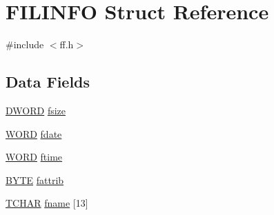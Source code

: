 \hypertarget{structFILINFO}{\section{F\-I\-L\-I\-N\-F\-O Struct Reference}
\label{structFILINFO}
}


{\ttfamily \#include $<$ff.\-h$>$}

\subsection*{Data Fields}
\begin{DoxyCompactItemize}
\item 
\hyperlink{integer_8h_ad342ac907eb044443153a22f964bf0af}{D\-W\-O\-R\-D} \hyperlink{structFILINFO_aee7441af7dc0c443d1e1e6011cc7dcac}{fsize}
\item 
\hyperlink{integer_8h_a197942eefa7db30960ae396d68339b97}{W\-O\-R\-D} \hyperlink{structFILINFO_a7c01c48a15b1b49da459924437b0bd52}{fdate}
\item 
\hyperlink{integer_8h_a197942eefa7db30960ae396d68339b97}{W\-O\-R\-D} \hyperlink{structFILINFO_ae0f751b79621bf7b29669f177bbe6b9a}{ftime}
\item 
\hyperlink{integer_8h_a4ae1dab0fb4b072a66584546209e7d58}{B\-Y\-T\-E} \hyperlink{structFILINFO_a838d542585831b085537b363f18205c0}{fattrib}
\item 
\hyperlink{ff_8h_a03bdb8ce5895c7e261aadc2529637546}{T\-C\-H\-A\-R} \hyperlink{structFILINFO_abd852510f2f79b4ec773156d8942dc7c}{fname} \mbox{[}13\mbox{]}
\end{DoxyCompactItemize}



